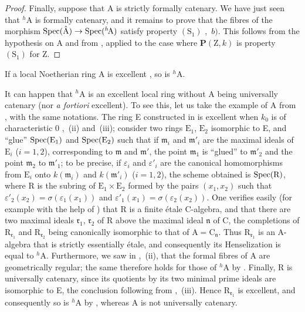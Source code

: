 \begin{proof}

Finally, suppose that A is strictly formally catenary.  We have just seen that ${}^h\!\mathrm{A}$ is formally catenary, and it remains to prove that the fibres of the morphism $\operatorname{Spec}(\hat{\mathrm{A}})\to\operatorname{Spec}({}^h\!\mathrm{A})$ satisfy property $(\mathrm{S}_1)$ ,~$b)$.  This follows from the hypothesis on A and from , applied to the case where $\boldsymbol{P}(\mathrm{Z},k)$ is property $(\mathrm{S}_1)$ for Z.
\end{proof}

\begin{corollary}[18.7.6]
\label{IV.18.7.6}
If a local Noetherian ring A is excellent , so is ${}^h\!\mathrm{A}$.
\end{corollary}

\begin{remark}[18.7.7]
\label{IV.18.7.7}
It can happen that ${}^h\!\mathrm{A}$ is an excellent local ring without A being universally catenary (nor \emph{a fortiori} excellent).
To see this, let us take the example of A from , with the same notations.
The ring E constructed in  is excellent when $k_0$ is of characteristic 0 ,~(ii) and~(iii);
consider two rings $\mathrm{E}_1$, $\mathrm{E}_2$ isomorphic to E, and ``glue'' $\operatorname{Spec}(\mathrm{E}_1)$ and $\operatorname{Spec}(\mathrm{E}_2)$ such that if $\mathfrak{m}_i$ and $\mathfrak{m}'_i$ are the maximal ideals of $\mathrm{E}_i$ ($i=1,2$), corresponding to $\mathfrak{m}$ and $\mathfrak{m}'$, the point $\mathfrak{m}_1$ is ``glued'' to $\mathfrak{m}'_2$ and the point $\mathfrak{m}_2$ to $\mathfrak{m}'_1$;
to be precise, if $\varepsilon_i$ and $\varepsilon'_i$ are the canonical homomorphisms from $\mathrm{E}_i$ onto $k(\mathfrak{m}_i)$ and $k(\mathfrak{m}'_i)$ ($i=1,2$), the scheme obtained is $\operatorname{Spec}(\mathrm{R})$, where R is the subring of $\mathrm{E}_1\times\mathrm{E}_2$ formed by the pairs $(x_1,x_2)$ such that $\varepsilon'_2(x_2)=\sigma(\varepsilon_1(x_1))$ and $\varepsilon'_1(x_1)=\sigma(\varepsilon_2(x_2))$.
One verifies easily (for example with the help of ) that R is a finite \'{e}tale C-algebra, and that there are two maximal ideals $\mathfrak{r}_1$, $\mathfrak{r}_2$ of R above the maximal ideal $\mathfrak{n}$ of C, the completions of $\mathrm{R}_{\mathfrak{r}_1}$ and $\mathrm{R}_{\mathfrak{r}_2}$ being canonically isomorphic to that of $\mathrm{A}=\mathrm{C}_{\mathfrak{n}}$.  Thus $\mathrm{R}_{\mathfrak{r}_1}$ is an A-algebra that is strictly essentially \'{e}tale, and consequently its Henselization is equal to ${}^h\!\mathrm{A}$.
Furthermore, we saw in ,~(ii), that the formal fibres of A are geometrically regular; the same therefore holds for those of ${}^h\!\mathrm{A}$ by .  Finally, R is universally catenary, since its quotients by its two minimal prime ideals are isomorphic to E, the conclusion following from ,~(iii).  Hence $\mathrm{R}_{\mathfrak{r}_1}$ is excellent, and consequently so is ${}^h\!\mathrm{A}$ by , whereas A is not universally catenary.
\end{remark}


